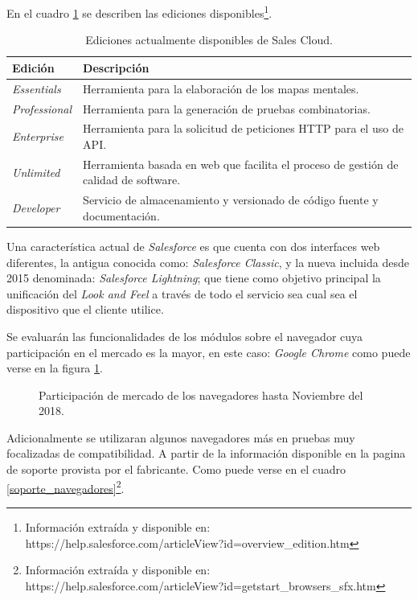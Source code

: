 En el cuadro \ref{ediciones} se describen las ediciones
disponibles\footnote{Información extraída y disponible en:
https://help.salesforce.com/articleView?id=overview\_edition.htm}.

\begin{table}
\centering
\begin{tabular}{|l|p{9.0cm}|}
\hline
\textbf{Edición} & \textbf{Descripción} \\
\hline
\emph{Essentials} & Herramienta para la elaboración de los mapas mentales. \\
\emph{Professional} & Herramienta para la generación de pruebas combinatorias. \\
\emph{Enterprise} & Herramienta para la solicitud de peticiones HTTP para el uso de API.\\
\emph{Unlimited} & Herramienta basada en web que facilita el proceso de gestión de calidad de software. \\
\emph{Developer} & Servicio de almacenamiento y versionado de código fuente y documentación. \\
\hline
\end{tabular}
\caption{Ediciones actualmente disponibles de Sales Cloud.}
\label{ediciones}
\end{table}

Una característica actual de \emph{Salesforce} es que cuenta con dos interfaces
web diferentes, la antigua conocida como: \emph{Salesforce Classic}, y la nueva
incluida desde 2015 denominada: \emph{Salesforce Lightning}; que tiene como
objetivo principal la unificación del \emph{Look and Feel} a través de todo el
servicio sea cual sea el dispositivo que el cliente utilice\cite{McCarthy}.

Se evaluarán las funcionalidades de los módulos sobre el navegador cuya
participación en el mercado es la mayor, en este caso: \emph{Google Chrome}
como puede verse en la figura \ref{software}.

\begin{figure}
\centering

\caption{Participación de mercado de los navegadores hasta Noviembre del 2018.}
\label{software}
\end{figure}

Adicionalmente se utilizaran algunos navegadores más en pruebas muy focalizadas
de compatibilidad. A partir de la información disponible en la pagina de soporte
provista por el fabricante. Como puede verse en el cuadro
\ref{soporte_navegadores}\footnote{Información extraída y disponible en:
https://help.salesforce.com/articleView?id=getstart\_browsers\_sfx.htm}.

